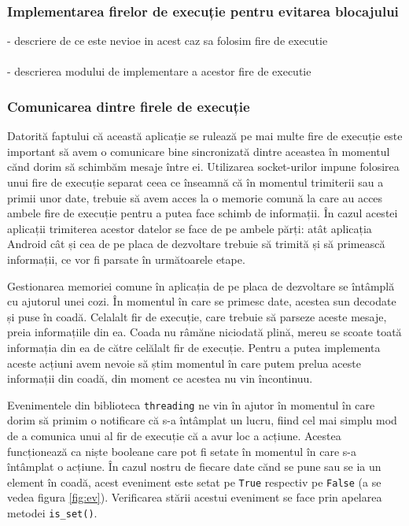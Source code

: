 \documentclass[../IoMusT.tex]{subfiles}
\begin{document}
\subsubsection{Implementarea firelor de execuție pentru evitarea blocajului}
- descriere de ce este nevioe in acest caz sa folosim fire de executie
\\
\\
- descrierea modului de implementare a acestor fire de executie
\subsubsection{Comunicarea dintre firele de execuție} %
Datorită faptului că această aplicație se rulează pe mai multe fire de execuție este important să avem o comunicare bine sincronizată dintre aceastea în momentul cănd dorim să schimbăm mesaje între ei. Utilizarea socket-urilor impune folosirea unui fire de execuție separat ceea ce înseamnă că în momentul trimiterii sau a primii unor date, trebuie să avem acces la o memorie comună la care au acces ambele fire de execuție pentru a putea face schimb de informații. În cazul acestei aplicații trimiterea acestor datelor se face de pe ambele părți: atât aplicația Android cât și cea de pe placa de dezvoltare trebuie să trimită și să primească informații, ce vor fi parsate în următoarele etape.
\\
\par Gestionarea memoriei comune în aplicația de pe placa de dezvoltare se întâmplă cu ajutorul unei cozi. În momentul în care se primesc date, acestea sun decodate și puse în coadă. Celalalt fir de execuție, care trebuie să parseze aceste mesaje, preia informațiile din ea. Coada nu râmăne niciodată plină, mereu se scoate toată informația din ea de către celălalt fir de execuție. Pentru a putea implementa aceste acțiuni avem nevoie să știm momentul în care putem prelua aceste informații din coadă, din moment ce acestea nu vin încontinuu.
\\
\par Evenimentele din biblioteca \verb|threading| ne vin în ajutor în momentul în care dorim să primim o notificare că s-a întâmplat un lucru, fiind cel mai simplu mod de a comunica unui al fir de execuție că a avur loc a acțiune. Acestea funcționează ca niște booleane care pot fi setate în momentul în care s-a întâmplat o acțiune. În cazul nostru de fiecare date cănd se pune sau se ia un element în coadă, acest eveniment este setat pe \verb|True| respectiv pe \verb|False|  (a se vedea figura \ref{fig:ev}). Verificarea stării acestui eveniment se face prin apelarea metodei \verb|is_set()|.
\end{document}
